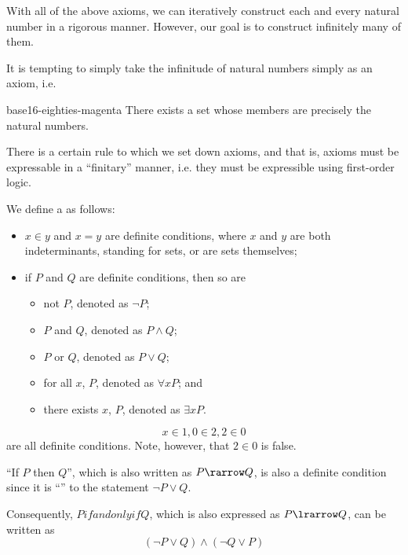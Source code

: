 \documentclass[notoc,notitlepage]{tufte-book}
\begin{document}
With all of the above axioms, we can iteratively construct each and every natural number in a rigorous manner. However, our goal is to construct infinitely many of them.

It is tempting to simply take the infinitude of natural numbers simply as an axiom, i.e.

\begin{quotebox}{base16-eighties-magenta}\label{sp:natural_numbers_axiom}
  There exists a set whose members are precisely the natural numbers.
\end{quotebox}

There is a certain rule to which we set down axioms, and that is, axioms must be expressable in a ``finitary'' manner, i.e. they must be expressible using first-order logic.

\begin{defn}
\label{defn:definite_condition}
  We define a  as follows:
  \begin{itemize}
    \item $x \in y$ and $x = y$ are definite conditions, where $x$ and $y$ are both indeterminants, standing for sets, or are sets themselves;
    \item if $P$ and $Q$ are definite conditions, then so are
      \begin{itemize}
        \item not $P$, denoted as $\neg P$;
        \item $P$ and $Q$, denoted as $P \land Q$;
        \item $P$ or $Q$, denoted as $P \lor Q$;
        \item for all $x$, $P$, denoted as $\forall x P$; and
        \item there exists $x$, $P$, denoted as $\exists x P$.
      \end{itemize}
  \end{itemize}
\end{defn}

\begin{eg}
  \begin{equation*}
    x \in 1, 0 \in 2 , 2 \in 0
  \end{equation*}
  are all definite conditions. Note, however, that $2 \in 0$ is false.
\end{eg}

\begin{note}
  ``If $P$ then $Q$'', which is also written as $P \rarrow Q$, is also a definite condition since it is ``'' to the statement $\neg P \lor Q$.

  Consequently, $P if and only if Q$, which is also expressed as $P \lrarrow Q$, can be written as
  \begin{equation*}
    (\neg P \lor Q) \land (\neg Q \lor P)
  \end{equation*}
\end{note}
\end{document}
